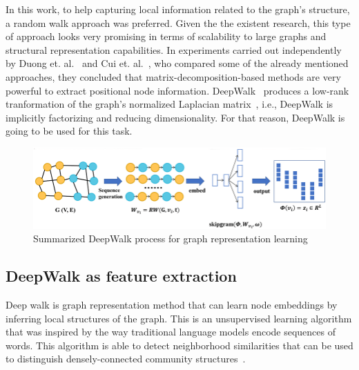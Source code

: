 In this work, to help capturing local information related to the graph's structure, a random walk approach was preferred. Given the the existent research, this type of approach looks very promising in terms of scalability to large graphs and structural representation capabilities. In experiments carried out independently by Duong et. al.~\cite{onnodefeatures} and Cui et. al.~\cite{onpositional}, who compared some of the already mentioned approaches, they concluded that matrix-decomposition-based methods are very powerful to extract positional node information. DeepWalk~\cite{deepwalk} produces a low-rank tranformation of the graph's normalized Laplacian matrix~\cite{factorizing}, i.e., DeepWalk is implicitly factorizing and reducing dimensionality. For that reason, DeepWalk is going to be used for this task.


\begin{figure}[h!]
    \begin{center}
        \includegraphics[scale=2]{deepwalk}
    \end{center}
    \caption{Summarized DeepWalk process for graph representation learning~\cite{deepwalkimage}}
    \label{fig:deepwalk}
\end{figure}

\newpage
\subsection{DeepWalk as feature extraction}

Deep walk is graph representation method that can learn node embeddings by inferring local structures of the graph. This is an unsupervised learning algorithm that was inspired by the way traditional language models encode sequences of words. This algorithm is able to detect neighborhood similarities that can be used to distinguish densely-connected community structures~\cite{deepwalk_hyper, deepwalk}.

